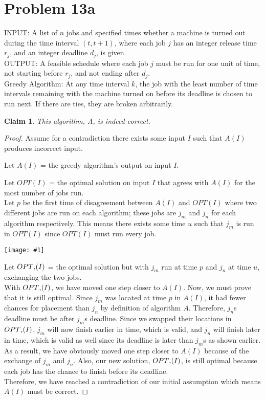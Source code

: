 \documentclass{article}
\newtheorem{thm}{Claim}
\providecommand{\prob}[1]{\section*{Problem #1}}
\providecommand{\image}[1]{
    \begin{center}
        \texttt{[image: \#1]}
    \end{center}
}
\begin{document}
	\prob{13a}
	INPUT: A list of $n$ jobs and specified times whether a machine is turned out during the time interval $(t, t + 1)$, where each job $j$ has an integer release time $r_j$, and an integer deadline $d_j$, is given. \\
	OUTPUT: A feasible schedule where each job $j$ must be run for one unit of time, not starting before $r_j$, and not ending after $d_j$. \\

	Greedy Algorithm: At any time interval $k$, the job with the least number of time intervals remaining with the machine turned on before its deadline is chosen to run next.  If there are ties, they are broken arbitrarily.

	\begin{thm}
		This algorithm, A, is indeed correct.
	\end{thm}

	\begin{proof}
		Assume for a contradiction there exists some input $I$ such that $A(I)$ produces incorrect input.

		Let $A(I)$ = the greedy algorithm's output on input $I$.

		Let $OPT(I)$ = the optimal solution on input $I$ that agrees
		with $A(I)$ for the most number of jobs run.\\

		Let $p$ be the first time of disagreement between $A(I)$ and $OPT(I)$ where two different jobs are run on each algorithm; these jobs are $j_m$ and $j_n$ for each algorithm respectively.  This means there exists some time $u$ such that $j_m$ is run in $OPT(I)$ since $OPT(I)$ must run every job.

		\image{p13atable}

		Let $OPT\textsc{\char13}(I)$ = the optimal solution but with $j_m$ run at time $p$ and $j_n$ at time $u$, exchanging the two jobs.\\

		With $OPT\textsc{\char13}(I)$, we have moved one step closer to $A(I)$.  Now, we must prove that it is still optimal.  Since $j_m$ was located at time $p$ in $A(I)$, it had fewer chances for placement than $j_n$ by definition of algorithm $A$.  Therefore, $j_n$\textsc{}s deadline must be after $j_m$\textsc{}s deadline.  Since we swapped their locations in $OPT\textsc{\char13}(I)$, $j_m$ will now finish earlier in time, which is valid, and $j_n$ will finish later in time, which is valid as well since its deadline is later than $j_m$\textsc{}s as shown earlier.\\

		As a result, we have obviously moved one step closer to $A(I)$ because of the exchange of $j_m$ and $j_n$.  Also, our new solution, $OPT\textsc{\char13}(I)$, is still optimal because each job has the chance to finish before its deadline.\\

		Therefore, we have reached a contradiction of our initial assumption which means $A(I)$ must be correct.
	\end{proof}
\end{document}

